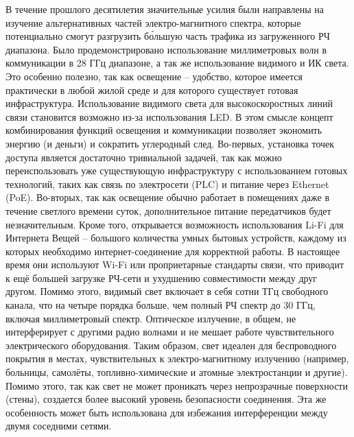В течение прошлого десятилетия значительные усилия были направлены на изучение альтернативных частей электро-магнитного спектра, которые потенциально смогут разгрузить б\'ольшую часть трафика из загруженного РЧ диапазона. Было продемонстрировано использование миллиметровых волн в коммуникации в 28 ГГц диапазоне, а так же использование видимого и ИК света. Это особенно полезно, так как освещение \--- удобство, которое имеется практически в любой жилой среде и для которого существует готовая инфраструктура. Использование видимого света для высокоскоростных линий связи становится возможно из-за использования LED. В этом смысле концепт комбинирования функций освещения и коммуникации позволяет экономить энергию (и деньги) и сократить углеродный след. Во-первых, установка точек доступа является достаточно тривиальной задачей, так как можно переиспользовать уже существующую инфраструктуру с использованием готовых технологий, таких как связь по электросети (PLC) и питание через Ethernet (PoE). Во-вторых, так как освещение обычно работает в помещениях даже в течение светлого времени суток, дополнительное питание передатчиков будет незначительным. Кроме того, открывается возможность использования Li-Fi для Интернета Вещей \--- большого количества умных бытовых устройств, каждому из которых необходимо интернет-соединение для корректной работы. В настоящее время они используют Wi-Fi или проприетарные стандарты связи, что приводит к ещё большей загрузке РЧ-сети и ухудшению совместимости между друг другом. Помимо этого, видимый свет включает в себя сотни ТГц свободного канала, что на четыре порядка больше, чем полный РЧ спектр до 30 ГГц, включая миллиметровый спектр. Оптическое излучение, в общем, не интерферирует с другими радио волнами и не мешает работе чувствительного электрического оборудования. Таким образом, свет идеален для беспроводного покрытия в местах, чувствительных к электро-магнитному излучению (например, больницы, самолёты, топливно-химические и атомные электростанции и другие). Помимо этого, так как свет не может проникать через непрозрачные поверхности (стены), создается более высокий уровень безопасности соединения. Эта же особенность может быть использована для избежания интерференции между двумя соседними сетями.



